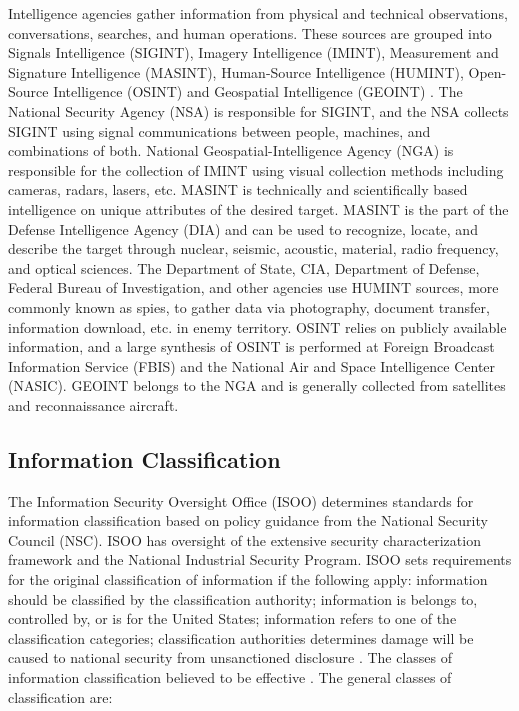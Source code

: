 \documentclass{report}
\begin{document}

Intelligence agencies gather information from physical and technical observations, conversations, searches, and human operations. These sources are grouped into Signals Intelligence (SIGINT), Imagery Intelligence (IMINT), Measurement and Signature Intelligence (MASINT), Human-Source Intelligence (HUMINT), Open-Source Intelligence (OSINT) and Geospatial Intelligence (GEOINT) \cite{Intelligen}. The National Security Agency (NSA) is responsible for SIGINT, and the NSA collects SIGINT using signal communications between people, machines, and combinations of both. National Geospatial-Intelligence Agency (NGA) is responsible for the collection of IMINT using visual collection methods including cameras, radars, lasers, etc. MASINT is technically and scientifically based intelligence on unique attributes of the desired target. MASINT is the part of the Defense Intelligence Agency (DIA) and can be used to recognize, locate, and describe the target through nuclear, seismic, acoustic, material, radio frequency, and optical sciences. The Department of State, CIA, Department of Defense, Federal Bureau of Investigation, and other agencies use HUMINT sources, more commonly known as spies, to gather data via photography, document transfer, information download, etc. in enemy territory. OSINT relies on publicly available information, and a large synthesis of OSINT is performed at Foreign Broadcast Information Service (FBIS) and the National Air and Space Intelligence Center (NASIC). GEOINT belongs to the NGA and is generally collected from satellites and reconnaissance aircraft. 

\subsection{Information Classification}

The Information Security Oversight Office (ISOO) determines standards for information classification based on policy guidance from the National Security Council (NSC). ISOO has oversight of the extensive security characterization framework and the National Industrial Security Program. ISOO sets requirements for the original classification of information if the following apply: information should be classified by the classification authority; information is belongs to, controlled by, or is for the United States; information refers to one of the classification categories; classification authorities determines damage will be caused to national security from unsanctioned disclosure \cite{Office2010}. The classes of information classification believed to be effective \cite{Richelson2011,Office2010}.  The general classes of classification are:
\end{document}
